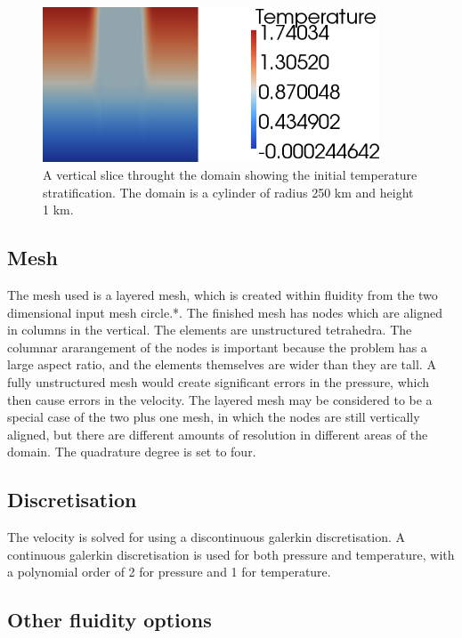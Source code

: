 \begin{figure}[h]
\begin{center}
\includegraphics[width=10cm]{examples_images/restratification_after_oodc/rousset-init.png}
\caption{A vertical slice throught the domain showing the initial temperature stratification. The domain is a cylinder of radius 250 km and height 1 km. }
\label{fig:rousset-init}
\end{center}
\end{figure}

\subsection{Mesh}

The mesh used is a layered mesh, which is created within fluidity from the two dimensional input mesh circle.*. The finished mesh has nodes which are aligned in columns in the vertical. The elements are unstructured tetrahedra. The columnar ararangement of the nodes is important because the problem has a large aspect ratio, and the elements themselves are wider than they are tall. A fully unstructured mesh would create significant errors in the pressure, which then cause errors in the velocity. The layered mesh may be considered to be a special case of the two plus one mesh, in which the nodes are still vertically aligned, but there are different amounts of resolution in different areas of the domain. The quadrature degree is set to four.

\subsection{Discretisation}

The velocity is solved for using a discontinuous galerkin discretisation. A continuous galerkin discretisation is used for both pressure and temperature, with a polynomial order of 2 for pressure and 1 for temperature. 

\subsection{Other fluidity options}

